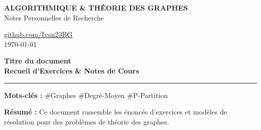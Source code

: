 \begin{titlepage}
    \pagecolor{bgcolor}
    \color{textcolor}
    
    \begin{minipage}[t]{0.65\textwidth}
        \raggedright\strut
        {\small\bfseries\color{exocolor} ALGORITHMIQUE \& THÉORIE DES GRAPHES}\\[2pt]
        {\small\color{fallbackcolor} Notes Personnelles de Recherche}
    \end{minipage}%
    \hfill
    \begin{minipage}[t]{0.3\textwidth}
        \raggedleft\strut
        {\small 
            \href{https://github.com/Ivan23BG/cours-graphes}{\color{fallbackcolor}github.com/Ivan23BG}\\[2pt]
            \color{fallbackcolor}\today
        }
    \end{minipage}

    \vfill

    \begin{tcolorbox}[
        enhanced,
        colback=boxbg,
        colframe=exocolor,
        boxrule=0pt,
        leftrule=4pt,
        arc=0mm,
        top=16pt, bottom=16pt, left=18pt, right=18pt
    ]
        {\Huge\bfseries\color{textcolor} Titre du document}\\[6pt] %
        {\large\color{exocolor}\bfseries Recueil d'Exercices \& Notes de Cours}
        
        \vspace{10pt}
        \color{textcolor}\rule{\textwidth}{0.4pt}
        \vspace{8pt}

        {\small
        \textbf{Mots-clés :} \#Graphes \quad \#Degré-Moyen \quad \#P-Partition
        }
    \end{tcolorbox}

    \vfill

    

    \vfill

    \begin{tcolorbox}[
        blanker,
        left=12pt,
        borderline west={1.5pt}{0pt}{fallbackcolor}
    ]
        {\small\color{fallbackcolor}
        \textbf{Résumé :} Ce document rassemble les énoncés d'exercices et modèles de résolution pour des problèmes de théorie des graphes.
        } %
    \end{tcolorbox}


\end{titlepage}
